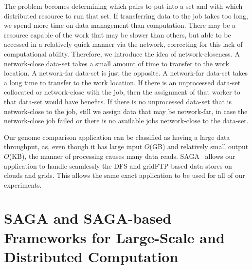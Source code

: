 \documentclass{rspublic}
\newcommand{\micnote}[1]{ {\textcolor{blue} { ***Michael: #1 }}}
\newcommand{\betynote}[1]{ {\textcolor{orange} { ***Bety: #1 }}}
\newcommand{\jhanote}[1]{} \newcommand{\micnote}[1]{}\newcommand{\betynote}[1]{} \newcommand{\fixme}[1]{}
\begin{document}
The problem becomes determining which pairs to put into a set and with
which distributed resource to run that set. If transferring data to the
job takes too long, we spend more time on data management than
computation.  There may be a resource capable of the work that may be
slower than others, but able to be accessed in a relatively quick manner
via the network, correcting for this lack of computational ability.
Therefore, we introduce the idea of network-closeness. A network-close
data-set takes a small amount of time to transfer to the work location.
A network-far data-set is just the opposite. A network-far data-set
takes a long time to transfer to the work location. If there is an
unprocessed data-set collocated or network-close with the job, then the
assignment of that worker to that data-set would have benefits. If there
is no unprocessed data-set that is network-close to the job, still we
assign data that may be network-far, in case the network-close job
failed or there is no available jobs network-close to the data-set.


Our genome comparison application can be classified as having a large
data throughput, as, even though it has large input $O$(GB) and
relatively small output $O$(KB), the manner of processing causes many
data reads. SAGA~\citep{saga_url} allows our application to handle
seamlessly the DFS and gridFTP based data stores on clouds and grids.
This allows the same exact application to be used for all of our
experiments. 

\section{SAGA and SAGA-based Frameworks for Large-Scale and
  Distributed Computation}\label{Sec:SAGA}

\end{document}
